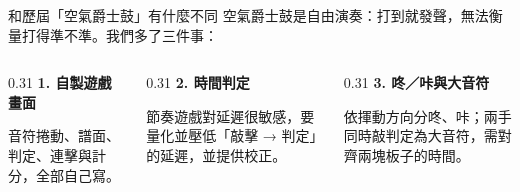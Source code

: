 \documentclass[aspectratio=169, 12pt]{beamer}
\begin{document}
\begin{frame}{和歷屆「空氣爵士鼓」有什麼不同}
空氣爵士鼓是自由演奏：打到就發聲，無法衡量打得準不準。我們多了三件事：
\vspace{0.8em}
\begin{columns}[T]
\begin{column}{0.31\textwidth}
\textbf{\color{taikored}1. 自製遊戲畫面}\par\vspace{0.3em}
{\small 音符捲動、譜面、判定、連擊與計分，全部自己寫。}
\end{column}
\begin{column}{0.31\textwidth}
\textbf{\color{taikored}2. 時間判定}\par\vspace{0.3em}
{\small 節奏遊戲對延遲很敏感，要量化並壓低「敲擊 → 判定」的延遲，並提供校正。}
\end{column}
\begin{column}{0.31\textwidth}
\textbf{\color{taikored}3. 咚／咔與大音符}\par\vspace{0.3em}
{\small 依揮動方向分咚、咔；兩手同時敲判定為大音符，需對齊兩塊板子的時間。}
\end{column}
\end{columns}
\end{frame}
\end{document}
